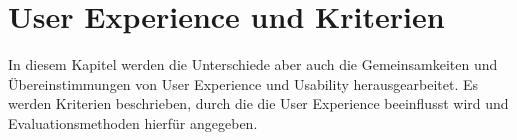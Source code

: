 \chapter{User Experience und Kriterien}
\label{Kapitel:UX}
In diesem Kapitel werden die Unterschiede aber auch die Gemeinsamkeiten und Übereinstimmungen von User Experience und Usability herausgearbeitet. Es werden Kriterien beschrieben, durch die die User Experience beeinflusst wird und Evaluationsmethoden hierfür angegeben.









